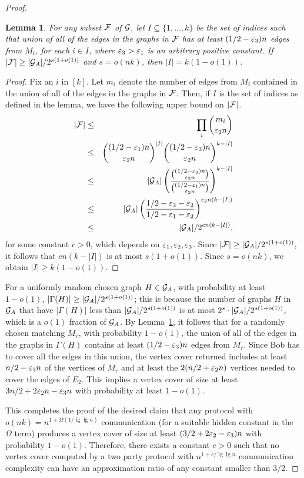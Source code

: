 \documentclass[11pt]{article}
\newtheorem{lemma}[theorem]{Lemma}
\begin{document}
\begin{proof}
\begin{lemma}
  \label{lemma: union}
For any subset ${\cal F}$ of ${\cal G}$, let $I \subseteq \{1, \ldots,
k\}$ be the set of indices such that union of all of the edges in the
graphs in ${\cal F}$ has at least $(1/2 - \varepsilon_3)n$ edges from $M_i$,
for each $i \in I$, where $\varepsilon_3 > \varepsilon_1$ is an arbitrary positive
constant.  If $|{\cal F}| \ge |{\cal G}_A|/2^{s(1 + o(1))}$ and
$s = o(nk)$, then $|I| = k(1 - o(1))$.
  \end{lemma}
\begin{proof}
  Fix an $i$ in $[k]$.  Let $m_i$ denote the number of edges from
  $M_i$ contained in the union of all of the edges in the graphs in
  ${\cal F}$.  Then, if $I$ is the set of indices as defined in the
  lemma, we have the following upper bound on $|{\cal F}|$.
  \begin{eqnarray*}
    |{\cal F}| & \le & \prod_i \binom{m_i}{\varepsilon_2 n}\\
    & \le & \binom{(1/2 - \varepsilon_1)n}{\varepsilon_2 n}^{|I|} \binom{(1/2 - \varepsilon_3)n}{\varepsilon_2 n}^{k-|I|}\\
    & \le & |{\cal G}_A| \left(\frac{\binom{(1/2 - \varepsilon_3)n}{\varepsilon_2 n}}{\binom{(1/2 - \varepsilon_1)n}{\varepsilon_2 n}}\right)^{k-|I|}\\
    & \le & |{\cal G}_A| \left(\frac{1/2 - \varepsilon_3 - \varepsilon_2}{1/2 - \varepsilon_1 - \varepsilon_2}\right)^{\varepsilon_2 n (k-|I|)}\\
    & \le & |{\cal G}_A|/2^{c n (k - |I|)},
  \end{eqnarray*}
  for some constant $c > 0$, which depends on $\varepsilon_1, \varepsilon_2,
  \varepsilon_3$.  Since $|{\cal F}| \ge |{\cal G}_A|/2^{s(1 + o(1))}$, it follows that $cn(k - |I|)$ is at most $s(1 + o(1))$.  Since $s
  = o(nk)$, we obtain $|I| \ge k(1 - o(1))$.
\end{proof}

For a uniformly random chosen graph $H \in {\cal G}_A$, with
probability at least $1 - o(1)$, $|\Gamma(H)| \ge |{\cal G}_A|/2^{s(1
  + o(1))}$; this is because the number of graphs $H$ in ${\cal G}_A$
that have $|\Gamma(H)|$ less than $|{\cal G}_A|/2^{s(1 + o(1))}$ is at
most $2^s \cdot |{\cal G}_A|/2^{s(1 + o(1))}$, which is a $o(1)$
fraction of ${\cal G}_A$.  By Lemma~\ref{lemma: union}, it follows
that for a randomly chosen matching $M_r$, with probability $1 -
o(1)$, the union of all of the edges in the graphs in $\Gamma(H)$
contains at least $(1/2 - \varepsilon_3)n$ edges from $M_r$.  Since Bob has
to cover all the edges in this union, the vertex cover returned
includes at least $n/2 - \varepsilon_3 n$ of the vertices of $M_r$ and at
least the $2(n/2 + \varepsilon_2 n)$ vertices needed to cover the edges of
$E_2$.  This implies a vertex cover of size at least $3n/2 + 2\varepsilon_2 n
- \varepsilon_3n$ with probability at least $1 - o(1)$.

This completes the proof of the desired claim that any protocol with
$o(nk) = n^{1 + \Omega(1/\lg\lg n)}$ communication (for a suitable hidden constant in the $\Omega$ term) produces a vertex cover of size at least $(3/2 +
2\varepsilon_2 - \varepsilon_3)n$ with probability $1 - o(1)$.  Therefore, there exists a constant $c > 0$ such that no vertex
cover computed by a two party protocol with $n^{1 + c/\lg\lg n}$ communication
complexity can have an approximation ratio of any constant smaller
than $3/2$.
 \end{proof}
\end{document}
